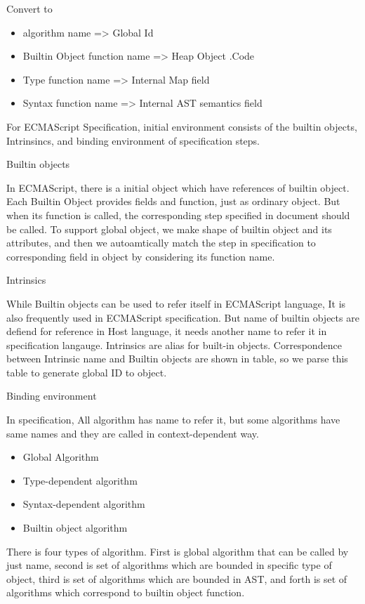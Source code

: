 Convert to
\begin{itemize}
\item algorithm name => Global Id
\item Builtin Object function name => Heap Object .Code
\item Type function name => Internal Map field
\item Syntax function name => Internal AST semantics field
\end{itemize}


For ECMAScript Specification, initial environment consists of the builtin objects, Intrinsincs, and binding environment of specification steps.

Builtin objects

 In ECMAScript, there is a initial object which have references of builtin object. Each Builtin Object provides fields and function, just as ordinary object. But when its function is called,
 the corresponding step specified in document should be called. To support global object, we make shape of builtin object and its attributes, and then we autoamtically match the step in specification to corresponding field in object by considering its function name.
 
 Intrinsics

 While Builtin objects can be used to refer itself in ECMAScript language, It is also frequently used in ECMAScript specification. But name of builtin objects
 are defiend for reference in Host language, it needs another name to refer it in specification langauge. Intrinsics are alias for built-in objects. 
 Correspondence between Intrinsic name and Builtin objects are shown in table, so we parse this table to generate global ID to object.

 Binding environment

 In specification, All algorithm has name to refer it, but some algorithms have same names and they are called in context-dependent way.
 \begin{itemize}
  \item Global Algorithm
  \item Type-dependent algorithm
  \item Syntax-dependent algorithm
  \item Builtin object algorithm
  \end{itemize}

 There is four types of algorithm. 
 First is global algorithm that can be called by just name, 
 second is set of algorithms which are bounded in specific type of object, 
 third is set of algorithms which are bounded in AST,
 and forth is set of algorithms which correspond to builtin object function.

